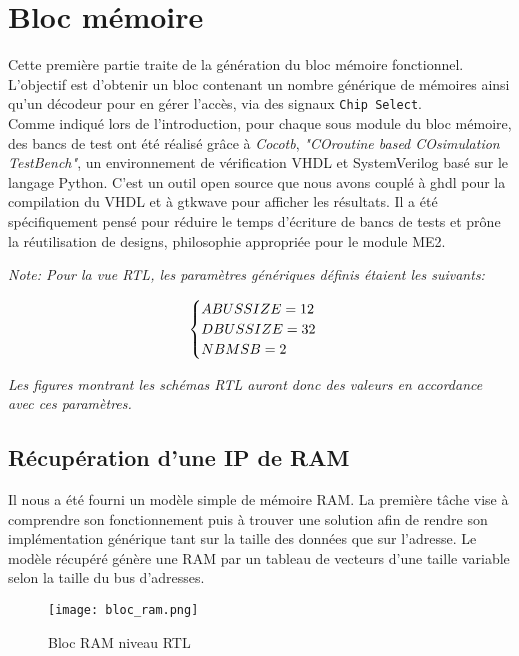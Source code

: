 \section{Bloc mémoire}

\indent Cette première partie traite de la génération du bloc mémoire fonctionnel.
L'objectif est d'obtenir un bloc contenant un nombre générique de mémoires ainsi qu'un décodeur pour en gérer l'accès, via des signaux \texttt{Chip Select}. \\
\indent Comme indiqué lors de l'introduction, pour chaque sous module du bloc mémoire, des bancs de test ont été réalisé grâce à \textit{Cocotb}, \textit{"COroutine based COsimulation TestBench"}, un environnement de vérification VHDL et SystemVerilog basé sur le langage Python.
C'est un outil open source que nous avons couplé à ghdl pour la compilation du VHDL et à gtkwave pour afficher les résultats.
Il a été spécifiquement pensé pour réduire le temps d'écriture de bancs de tests et prône la réutilisation de designs, philosophie appropriée pour le module ME2. \\
\gap

\noindent\textit{Note: Pour la vue \gls{RTL}, les paramètres génériques définis étaient les suivants:}

\begin{equation}
	\notag
	\begin{cases}
		ABUS SIZE = 12 & \\
		DBUS SIZE = 32 & \\
		NB MSB = 2
	\end{cases}
\end{equation}

\noindent\textit{Les figures montrant les schémas \gls{RTL} auront donc des valeurs en accordance avec ces paramètres.
}

\subsection{Récupération d'une IP de RAM}

\indent Il nous a été fourni un modèle simple de mémoire \gls{RAM}.
La première tâche vise à comprendre son fonctionnement puis à trouver une solution afin de rendre son implémentation générique tant sur la taille des données que sur l'adresse.
Le modèle récupéré génère une \gls{RAM} par un tableau de vecteurs d'une taille variable selon la taille du bus d'adresses.

\begin{figure}[h]
	\centering
	\texttt{[image: bloc\_ram.png]}
	\caption{Bloc RAM niveau RTL}
	\label{fig:synth_bloc_ram}
\end{figure}

